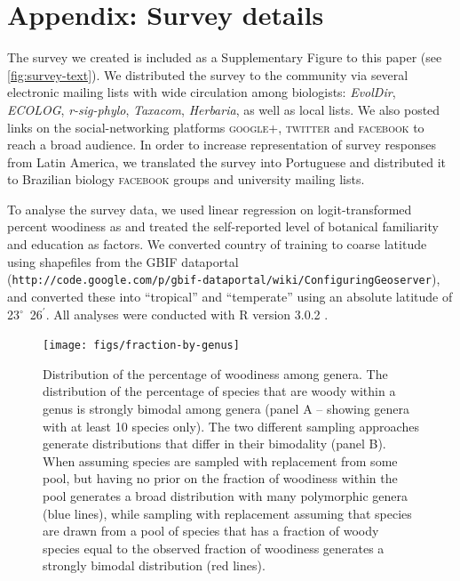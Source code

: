 \documentclass[a4paper,12pt]{article}
\begin{document}
\section{Appendix: Survey details}
%
The survey we created is included as a Supplementary Figure to
this paper (see \ref{fig:survey-text}). We distributed the survey to the 
community via several electronic
mailing lists with wide circulation among biologists: \emph{EvolDir},
\emph{ECOLOG}, \emph{\mbox{r-sig-phylo}}, \emph{Taxacom},
\emph{Herbaria}, as well as local lists. We also posted links on the
social-networking platforms \textsc{google+}, \textsc{twitter} and
\textsc{facebook} to reach a broad audience.
%
In order to increase representation of survey responses from Latin
America, we translated the survey into Portuguese and distributed it
to Brazilian biology \textsc{facebook} groups and university mailing
lists.

To analyse the survey data, we used linear regression on
logit-transformed percent woodiness as \citep[see][]{wartonarcsine}
and treated the self-reported level of botanical familiarity and
education as factors.  We converted country of training to coarse
latitude using shapefiles
from the GBIF dataportal\\
(\texttt{http://code.google.com/p/gbif-dataportal/wiki/ConfiguringGeoserver}),
and converted these into ``tropical'' and ``temperate'' using an
absolute latitude of 23$^\circ$~26$^\prime$.  All analyses were
conducted with R version 3.0.2 \citep{R}.





\begin{figure}[p]
  \centering
  \texttt{[image: figs/fraction-by-genus]}
  \caption{Distribution of the percentage of woodiness among genera.
    The distribution of the percentage of species that are woody within
    a genus is strongly bimodal among genera (panel A -- showing
    genera with at least 10 species only).
    The two different sampling approaches generate distributions that
    differ in their bimodality (panel B). When assuming species are
    sampled with replacement from some pool, but having no prior on
    the fraction of woodiness within the pool generates a broad
    distribution with many polymorphic genera (blue lines), while
    sampling with replacement assuming that species are drawn from a
    pool of species that has a fraction of woody species equal to the
    observed fraction of woodiness generates a strongly bimodal
    distribution (red lines).}
  \label{fig:distribution-genera}
\end{figure}
\end{document}
